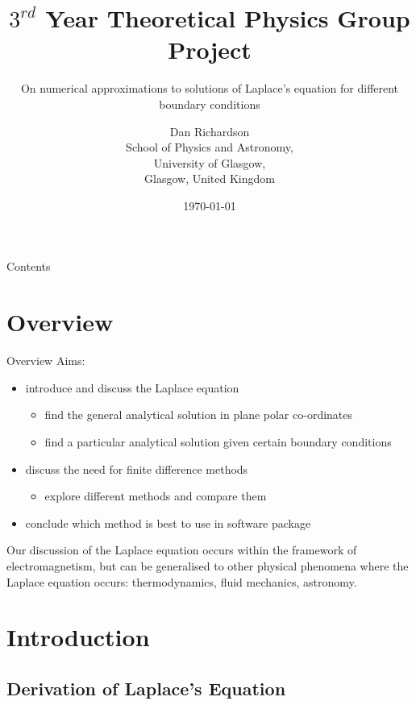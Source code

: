 \documentclass{beamer}
\title{$3^{rd}$ Year Theoretical Physics Group Project}
\subtitle{On numerical approximations to solutions of Laplace's equation for different boundary conditions}
\author{Dan Richardson\\
        School of Physics and Astronomy,\\
        University of Glasgow,\\
        Glasgow, United Kingdom}
\date{\today}
\begin{document}

\begin{frame} 
\titlepage
\end{frame}

\begin{frame}{Contents}
\tableofcontents
\end{frame}

\section{Overview}
\begin{frame}{Overview}
Aims:
\begin{itemize}
\item introduce and discuss the Laplace equation
\pause
 \begin{itemize}
 \item find the general analytical solution in plane polar co-ordinates
 \pause
 \item find a particular analytical solution given certain boundary conditions
 \end{itemize}
\pause
\item discuss the need for finite difference methods
\pause
 \begin{itemize} 
 \item explore different methods and compare them
 \end{itemize}
\pause
\item conclude which method is best to use in software package
\end{itemize}

\pause
Our discussion of the Laplace equation occurs within the framework of electromagnetism,
but can be generalised to other physical phenomena where the Laplace equation occurs:
thermodynamics, fluid mechanics, astronomy.
\end{frame}

\section{Introduction}
\subsection{Derivation of Laplace's Equation}
\end{document}
